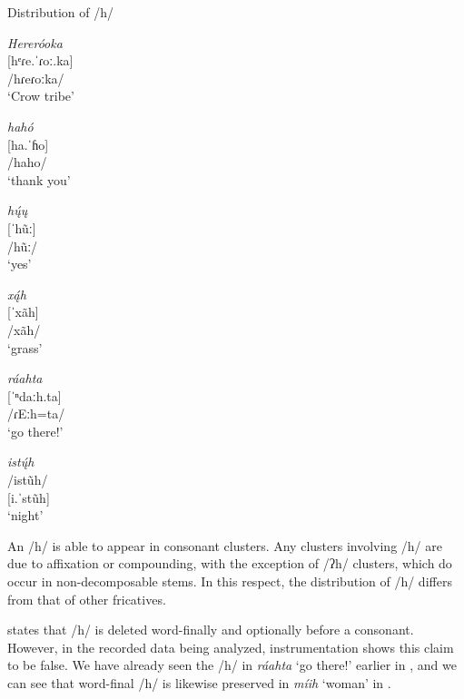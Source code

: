 \begin{exe}

\item\label{codaH} Distribution of /h/

\begin{xlist}

\item 	\textit{Hereróoka}\\
	{[}hᵉɾe.ˈɾoː.ka]\\
        /hɾeɾoːka/\\
		`Crow tribe'

\item 	\textit{hahó}\\
	{[}ha.ˈɦo]\\
        /haho/\\
	`thank you'

\item 	\textit{hų́ų}\\
	{[}ˈhũː]\\
        /hũː/\\
	`yes'

\item 	\textit{xą́h}\\
	{[}ˈxãh]\\
    /xãh/\\
	`grass'

\item 	\textit{ráahta}\\
	{[}ˈⁿdaːh.ta]\\
        /ɾEːh=ta/\\
	`go there!'

\item 	\textit{istų́h}\\
        /istũh/\\
        {[}i.ˈstũh]\\
	`night'

\end{xlist}

\end{exe}

An /h/ is able to appear in consonant clusters. Any clusters involving /h/ are due to affixation or compounding, with the exception of /ʔh/ clusters, which do occur in non-decomposable stems. In this respect, the distribution of /h/ differs from that of other fricatives.

\citet[43]{hollow1970} states that /h/ is deleted word-finally and optionally before a consonant. However, in the recorded data being analyzed, instrumentation shows this claim to be false. We have already seen the /h/ in \textit{ráahta} `go there!' earlier in , and we can see that word-final /h/ is likewise preserved in \textit{míih} `woman' in .


